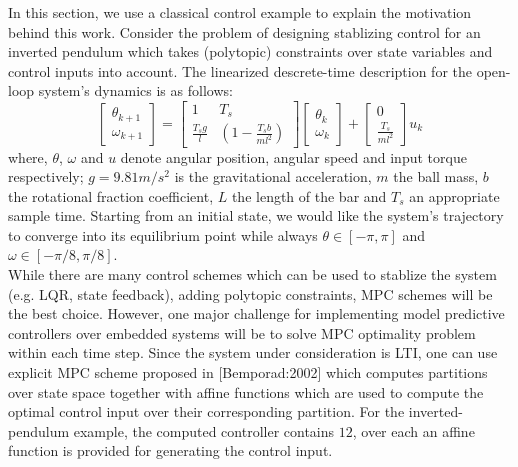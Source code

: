 In this section, we use a classical control example to explain the motivation behind this work. Consider the problem of designing stablizing control for an inverted pendulum which takes (polytopic) constraints over state variables and control inputs into account. The linearized descrete-time description for the open-loop system's dynamics is as follows:
	\begin{equation}
		\begin{bmatrix}
			 \theta_{k+1}\\
			\omega_{k+1}
		\end{bmatrix}=
		\begin{bmatrix}
			1 & T_s\\
			\frac{T_sg}{l}& (1-\frac{T_sb}{ml^2})		
		\end{bmatrix}
		\begin{bmatrix}
			\theta_k\\
			\omega_k
		\end{bmatrix}+
		\begin{bmatrix}
			0\\
			\frac{T_s}{ml^2}
		\end{bmatrix}u_k
		\label{eq:pendul_ss}
	\end{equation}
	where, $\theta$, $\omega$ and $u$ denote angular position, angular speed and input torque respectively; $g=9.81 m/s^2$ is the gravitational acceleration, $m$ the ball mass, $b$ the rotational fraction coefficient, $L$ the length of the bar and $T_s$ an appropriate sample time. Starting from an initial state, we would like the system's trajectory to converge into its equilibrium point while always $\theta\in[-\pi,\pi]$ and $\omega\in[-\pi/8,\pi/8]$. \\
	While there are many control schemes which can be used to stablize the system (e.g. LQR, state feedback), adding polytopic constraints, MPC schemes will be the best choice. 
	However, one major challenge for implementing model predictive controllers over embedded systems will be to solve MPC optimality problem within each time step. Since the system under consideration is LTI, one can use explicit MPC scheme proposed in [Bemporad:2002] which computes partitions over state space together with affine functions which are used to compute the optimal control input over their corresponding partition. For the inverted-pendulum example, the computed controller contains $12$, over each an affine function is provided for generating the control input.\\
